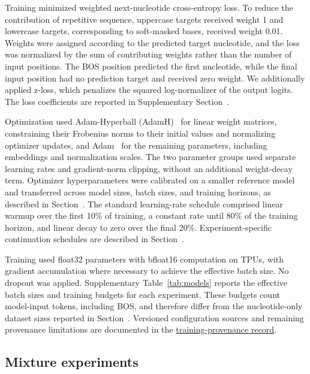 \documentclass[a4paper,num-refs]{oup-contemporary}
\begin{document}
Training minimized weighted next-nucleotide cross-entropy loss.
To reduce the contribution of repetitive sequence, uppercase
targets received weight 1 and lowercase targets, corresponding
to soft-masked bases, received weight 0.01.
Weights were assigned according to the predicted target nucleotide,
and the loss was normalized by the sum of contributing weights
rather than the number of input positions.
The BOS position predicted the first nucleotide, while the final
input position had no prediction target and received zero weight.
We additionally applied z-loss, which penalizes the squared
log-normalizer of the output logits.
The loss coefficients are reported in
Supplementary Section~.

Optimization used Adam-Hyperball (AdamH)~\citep{wen2026hyperball}
for linear weight matrices, constraining their Frobenius norms to
their initial values and normalizing optimizer updates, and
Adam~\citep{kingma2015adam} for the remaining parameters,
including embeddings and normalization scales.
The two parameter groups used separate learning rates and
gradient-norm clipping, without an additional weight-decay term.
Optimizer hyperparameters were calibrated on a smaller reference
model and transferred across model sizes, batch sizes, and training
horizons, as described in Section~.
The standard learning-rate schedule comprised linear warmup over
the first 10\% of training, a constant rate until 80\% of the
training horizon, and linear decay to zero over the final 20\%.
Experiment-specific continuation schedules are described in
Section~.

Training used float32 parameters with bfloat16 computation on TPUs,
with gradient accumulation where necessary to achieve the effective
batch size.
No dropout was applied.
Supplementary Table~\ref{tab:models} reports the effective batch
sizes and training budgets for each experiment.
These budgets count model-input tokens, including BOS, and
therefore differ from the nucleotide-only dataset sizes reported
in Section~.
Versioned configuration sources and remaining provenance
limitations are documented in the
\href{https://github.com/Open-Athena/marin-dna-paper/blob/main/data/training_provenance/sources.json}{training-provenance record}.


\subsection{Mixture experiments}\label{methods:mixtures}
\end{document}

